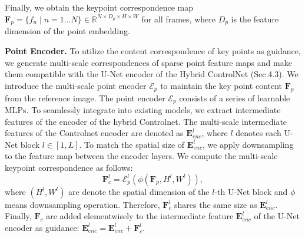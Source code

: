 Finally, we obtain the keypoint correspondence map $\mathbf{F}_p=\{f_n\!\mid\!n=1\dots N\} \!\in\!\mathbb{R}^{N\times D_p \times H \times W}$ for all frames, where $D_p$ is the feature dimension of the point embedding.

\textbf{Point Encoder.} 
To utilize the content correspondence of key points as guidance, we generate multi-scale correspondences of sparse point feature maps and make them compatible with the U-Net encoder of the {Hybrid ControlNet (Sec.4.3)}. 
We introduce the multi-scale point encoder $\mathcal{E}_p$ to maintain the key point content $\mathbf{F}_p$ from the reference image. The point encoder $\mathcal{E}_p$ consists of a series of learnable MLPs.
{
To seamlessly integrate into existing models, we extract intermediate features of the encoder of the hybrid Controlnet.
The multi-scale intermediate features of the Controlnet encoder are denoted as $\mathbf{E}^l_{enc}$, where $l$ denotes each U-Net block $l\!\in\![1, L]$.}
To match the spatial size of $\mathbf{E}^l_{enc}$, we apply downsampling to the feature map between the encoder layers. We compute the multi-scale keypoint correspondence as follows:
\begin{equation}
    \mathbf{F}_c^l = \mathcal{E}_p^l(\phi(\mathbf{F}_p, H^l, W^l)),
\end{equation}
where $(H^l, W^l)$ are denote the spatial dimension of the $l$-th U-Net block and $\phi$ means downsampling operation. Therefore, $\mathbf{F}_c^l$ shares the same size as $\mathbf{E}^l_{enc}$.
Finally, $\mathbf{F}_c$ are added elementwisely to the intermediate feature $\mathbf{E}^l_{enc}$ of the U-Net encoder as guidance: $\mathbf{E}^l_{enc}\!=\!\mathbf{E}^l_{enc}+\mathbf{F}_c^l$.


